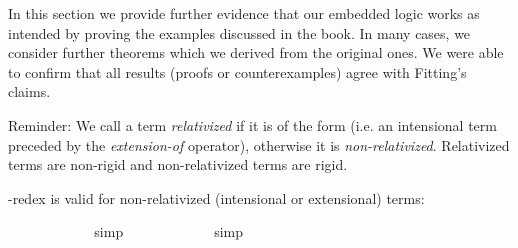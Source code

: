 %
\begin{isabellebody}%
%
%
%
%
%
%
%
%
\isamarkuptrue%
%
\begin{isamarkuptext}%
In this section we provide further evidence that our embedded logic works as intended by proving the examples discussed in the book.
 In many cases, we consider further theorems which we derived from the original ones. We were able to confirm that all results
 (proofs or counterexamples) agree with Fitting's claims.%
\end{isamarkuptext}\isamarkuptrue%
%
\isamarkuptrue%
%
\begin{isamarkuptext}%
Reminder: We call a term \emph{relativized} if it is of the form \isa{{\isasymdown}{\isasymalpha}}
(i.e. an intensional term preceded by the \emph{extension-of} operator), otherwise it is \emph{non-relativized}.
Relativized terms are non-rigid and non-relativized terms are rigid.%
\end{isamarkuptext}\isamarkuptrue%
%
\isamarkuptrue%
%
\begin{isamarkuptext}%
\isa{{\isasymbeta}{\isasymeta}}-redex is valid for non-relativized (intensional or extensional) terms:%
\end{isamarkuptext}\isamarkuptrue%
\isamarkupfalse%
\ {\isachardoublequoteopen}{\isasymlfloor}{\isacharparenleft}{\isacharparenleft}{\isasymlambda}{\isasymalpha}{\isachardot}\ {\isasymphi}\ {\isasymalpha}{\isacharparenright}\ \ {\isacharparenleft}{\isasymtau}{\isacharcolon}{\isacharcolon}{\isasymup}{\isasymzero}{\isacharparenright}{\isacharparenright}\ \isactrlbold {\isasymleftrightarrow}\ {\isacharparenleft}{\isasymphi}\ \ {\isasymtau}{\isacharparenright}{\isasymrfloor}{\isachardoublequoteclose}%
\ %
%
\isamarkupfalse%
\ simp%
%
%
\isanewline
{}\isamarkupfalse%
\ {\isachardoublequoteopen}{\isasymlfloor}{\isacharparenleft}{\isacharparenleft}{\isasymlambda}{\isasymalpha}{\isachardot}\ {\isasymphi}\ {\isasymalpha}{\isacharparenright}\ \ {\isacharparenleft}{\isasymtau}{\isacharcolon}{\isacharcolon}{\isasymzero}{\isacharparenright}{\isacharparenright}\ \isactrlbold {\isasymleftrightarrow}\ {\isacharparenleft}{\isasymphi}\ \ {\isasymtau}{\isacharparenright}{\isasymrfloor}{\isachardoublequoteclose}%
\ %
%
\isamarkupfalse%
\ simp%
%
%
\isanewline

\end{isabellebody}
